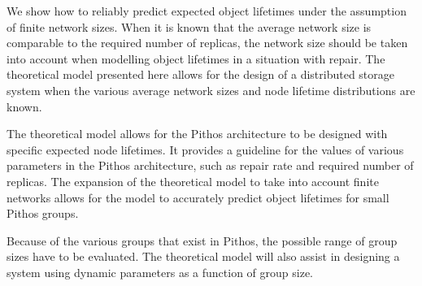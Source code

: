 We show how to reliably predict expected object lifetimes under the assumption of finite network sizes. When it is known that the average network size is comparable to the required number of replicas, the network size should be taken into account when modelling object lifetimes in a situation with repair. The theoretical model presented here allows for the design of a distributed storage system when the various average network sizes and node lifetime distributions are known.

The theoretical model allows for the Pithos architecture to be designed with specific expected node lifetimes. It provides a guideline for the values of various parameters in the Pithos architecture, such as repair rate and required number of replicas. The expansion of the theoretical model to take into account finite networks allows for the model to accurately predict object lifetimes for small Pithos groups.

Because of the various groups that exist in Pithos, the possible range of group sizes have to be evaluated. The theoretical model will also assist in designing a system using dynamic parameters as a function of group size.
